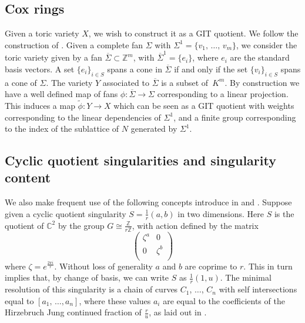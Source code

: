 \documentclass[12pt,a4paper]{book}      %
\theoremstyle{definition}
\newcommand{\mb}[1]{\mathbb{#1}}
\newcommand{\ra}{\rightarrow}
\begin{document}
\subsection{Cox rings}
Given a toric variety $X$, we wish to construct it as a GIT quotient. We follow the construction of \cite{cox}. Given a complete fan $\Sigma$ with $\Sigma^1 = \{ v_1, \, \dots , \, v_m\}$, we consider the toric variety given by a fan $\overline{\Sigma} \subset \mb{Z}^m$, with
$\overline{\Sigma}^1 = \{e_i\}$, where $e_i$ are the standard basis vectors. A set $\{e_i\}_{i \in S}$ spans a cone in $\overline{\Sigma}$ if and only if the set $\{v_i \}_{i \in S}$ spans a cone of $\Sigma$. The variety $Y$ associated to $\overline{\Sigma}$ is a subset of~$K^m$. By construction we have a well defined map of fans $\phi \colon \overline{\Sigma} \ra \Sigma$ corresponding to a linear projection. This induces a map $\tilde{\phi} \colon Y \ra X$ which can be seen as a GIT quotient with weights corresponding to the linear dependencies of $\Sigma^1$, and a finite group corresponding to the index of the sublattice of $N$ generated by $\Sigma^1$.

\subsection{Cyclic quotient singularities and singularity content}

We also make frequent use of the following concepts introduce in \cite{Reid-cyclic} and \cite{SingContent}. Suppose given a cyclic quotient singularity $S=\frac{1}{r}(a,b)$ in two dimensions. Here $S$ is the quotient of $\mb{C}^2$ by the group $G \cong \frac{\mb{Z}}{r\mb{Z}}$, with action defined by the matrix
\[
\left(
\begin{array}{cc}
\zeta^a & 0 \\
0 & \zeta^b \\
\end{array}
\right)
\]
where $\zeta = e^{\frac{2 \pi i}{r}}$. Without loss of generality $a$ and $b$ are coprime to $r$. This in turn implies that, by change of basis, we can write $S$ as $\frac{1}{r}(1,u)$. The minimal resolution of this singularity is a chain of curves $C_1$, $\dots$, $C_n$ with self intersections equal to $[a_1,\, \dots , a_n]$, where these values $a_i$ are equal to the coefficients of the Hirzebruch Jung continued fraction of $\frac{r}{u}$, as laid out in \cite{Reid-cyclic}.
\end{document}
